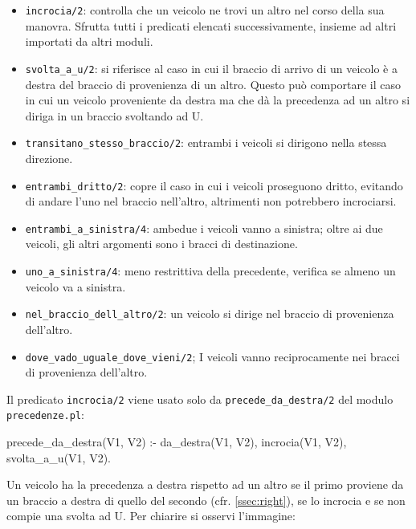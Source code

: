 \begin{itemize}
	\item \texttt{incrocia/2}: controlla che un veicolo ne trovi un altro nel corso della sua manovra. Sfrutta tutti i predicati elencati successivamente, insieme ad altri importati da altri moduli.
	
	\item \texttt{svolta\_a\_u/2}: si riferisce al caso in cui il braccio di arrivo di un veicolo è a destra del braccio di provenienza di un altro. Questo può comportare il caso in cui un veicolo proveniente da destra ma che dà la precedenza ad un altro si diriga in un braccio svoltando ad U.
	
	\item \texttt{transitano\_stesso\_braccio/2}: entrambi i veicoli si dirigono nella stessa direzione.
	
	\item \texttt{entrambi\_dritto/2}: copre il caso in cui i veicoli proseguono dritto, evitando di andare l'uno nel braccio nell'altro, altrimenti non potrebbero incrociarsi.
	
	\item \texttt{entrambi\_a\_sinistra/4}: ambedue i veicoli vanno a sinistra; oltre ai due veicoli, gli altri argomenti sono i bracci di destinazione.
	
	\item \texttt{uno\_a\_sinistra/4}: meno restrittiva della precedente, verifica se almeno un veicolo va a sinistra.
	
	\item \texttt{nel\_braccio\_dell\_altro/2}: un veicolo si dirige nel braccio di provenienza dell'altro.
	
	\item \texttt{dove\_vado\_uguale\_dove\_vieni/2}; I veicoli vanno reciprocamente nei bracci di provenienza dell'altro.
\end{itemize}

Il predicato \texttt{incrocia/2} viene usato solo da \texttt{precede\_da\_destra/2} del modulo \texttt{precedenze.pl}:

\begin{verbatimtab}
precede_da_destra(V1, V2) :-
	da_destra(V1, V2),
	incrocia(V1, V2),
	\+ svolta_a_u(V1, V2).
\end{verbatimtab}

Un veicolo ha la precedenza a destra rispetto ad un altro se il primo proviene da un braccio a destra di quello del secondo (cfr. \ref{ssec:right}), se lo incrocia e se non compie una svolta ad U. Per chiarire si osservi l'immagine:

